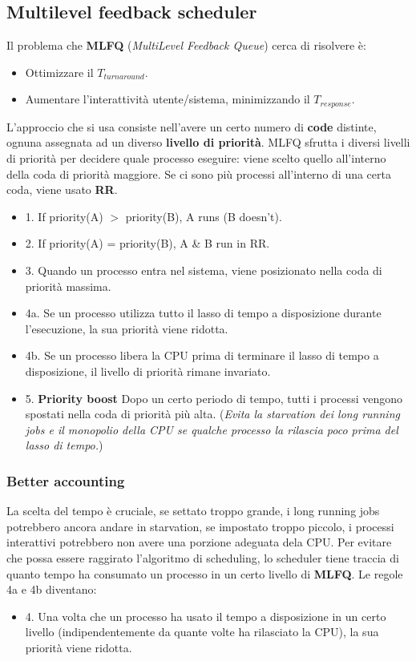 \documentclass[12pt, twoside, letterpaper]{article}
\begin{document}
		\subsection{Multilevel feedback scheduler}
			Il problema che \textbf{MLFQ} (\textit{MultiLevel Feedback Queue}) cerca di risolvere è: 
			\begin{itemize}
				\item Ottimizzare il $T_{turnaround}$.
				\item Aumentare l'interattività utente/sistema, minimizzando il $T_{response}$.
			\end{itemize}
			L'approccio che si usa consiste nell'avere un certo numero di \textbf{code} distinte, ognuna assegnata ad un diverso \textbf{livello di priorità}. MLFQ sfrutta i diversi livelli di priorità per decidere quale processo eseguire: viene scelto quello all'interno della coda di priorità maggiore. Se ci sono più processi all'interno di una certa coda, viene usato \textbf{RR}.
			\begin{itemize}
				\item 1. If priority(A) $>$ priority(B), A runs (B doesn't).
				\item 2. If priority(A) = priority(B), A \& B run in RR.
				\item 3. Quando un processo entra nel sistema, viene posizionato nella coda di priorità massima.
				\item 4a. Se un processo utilizza tutto il lasso di tempo a disposizione durante l'esecuzione, la sua priorità viene ridotta.
				\item 4b. Se un processo libera la CPU prima di terminare il lasso di tempo a disposizione, il livello di priorità rimane invariato.
				\item 5. \textbf{Priority boost }Dopo un certo periodo di tempo, tutti i processi vengono spostati nella coda di priorità più alta. (\textit{Evita la starvation dei long running jobs e il monopolio della CPU se qualche processo la rilascia poco prima del lasso di tempo.})
			\end{itemize}
			
			\subsubsection{Better accounting}
				La  scelta del tempo è cruciale, se settato troppo grande, i long running jobs potrebbero ancora andare in starvation, se impostato troppo piccolo, i processi interattivi potrebbero non avere una porzione adeguata dela CPU. 
				Per evitare che possa essere raggirato l'algoritmo di scheduling, lo scheduler tiene traccia di quanto tempo ha consumato un processo in un certo livello di \textbf{MLFQ}. Le regole 4a e 4b diventano: \\
				\begin{itemize}
					\item 4. Una volta che un processo ha usato il tempo a disposizione in un certo livello (indipendentemente da quante volte ha rilasciato la CPU), la sua priorità viene ridotta.
				\end{itemize}								
\end{document}
